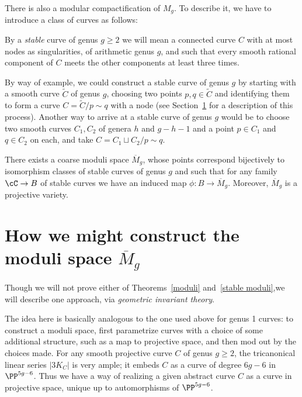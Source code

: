 There is also a modular compactification of $M_g$. To describe it, we have to introduce a class of curves as follows:

\begin{definition}
By a \emph{stable} curve of genus $g \geq 2$ we will mean a connected curve $C$ with at most nodes as singularities, of arithmetic genus $g$, and such that every smooth rational component of $C$ meets the other components at least three times.
\end{definition}

By way of example, we could construct a stable curve of genus $g$ by starting with a smooth curve $\tilde C$ of genus $g$, choosing two points $p, q \in \tilde C$ and identifying them to form a curve $C = \tilde C/p\sim q$ with a node (see Section~\ref{} for a description of this process). Another way to arrive at a stable curve of genus $g$ would be to choose two smooth curves $C_1, C_2$ of genera $h$ and $g-h-1$ and a point $p \in C_1$ and $q \in C_2$ on each, and take $C = C_1 \sqcup C_2 /p\sim q$.



\begin{theorem}\label{stable moduli}
There exists a coarse moduli space $\overline M_g$, whose points correspond bijectively to isomorphism classes of stable curves of genus $g$ and such that for any family $\cC \to B$ of stable curves we have an induced map $\phi : B \to \overline M_g$. Moreover, $\overline M_g$ is a projective variety.
\end{theorem}

\section{How we might construct the moduli space $\overline M_g$}

Though we will not prove either of Theorems~\ref{moduli} and~\ref{stable moduli},we will describe one approach, via \emph{geometric invariant theory}.

The  idea here is basically analogous to the one used above for genus 1 curves: to construct a moduli space, first parametrize curves with a choice of some additional structure, such as a map to projective space, and then mod out by the choices made. For any smooth projective curve $C$ of genus $g\geq 2$, the tricanonical linear series $|3K_C|$ is very ample; it embeds $C$ as a curve of degree $6g-6$ in $\PP^{5g-6}$. Thus we have a way of realizing a given abstract curve $C$ as a curve in projective space, unique up to automorphisms of $\PP^{5g-6}$.

